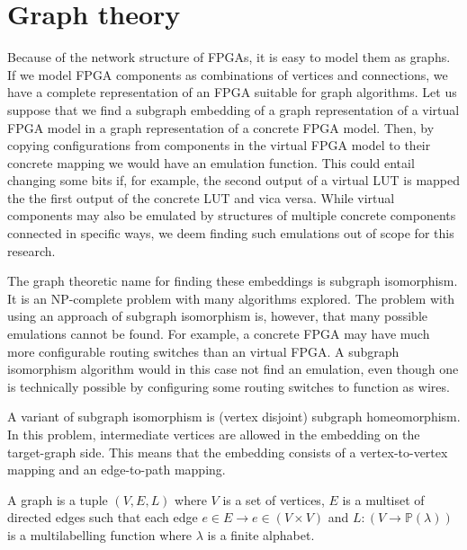\section{Graph theory}
Because of the network structure of FPGAs, it is easy to model them as graphs. If we model FPGA components as combinations of vertices and connections, we have a complete representation of an FPGA suitable for graph algorithms. Let us suppose that we find a subgraph embedding of a graph representation of a virtual FPGA model in a graph representation of a concrete FPGA model. Then, by copying configurations from components in the virtual FPGA model to their concrete mapping we would have an emulation function. This could entail changing some bits if, for example, the second output of a virtual LUT is mapped the the first output of the concrete LUT and vica versa. While virtual components may also be emulated by structures of multiple concrete components connected in specific ways, we deem finding such emulations out of scope for this research.

The graph theoretic name for finding these embeddings is subgraph isomorphism. It is an NP-complete problem\cite{cook} with many algorithms explored. The problem with using an approach of subgraph isomorphism is, however, that many possible emulations cannot be found. For example, a concrete FPGA may have much more configurable routing switches than an virtual FPGA. A subgraph isomorphism algorithm would in this case not find an emulation, even though one is technically possible by configuring some routing switches to function as wires.

A variant of subgraph isomorphism is (vertex disjoint) subgraph homeomorphism. In this problem, intermediate vertices are allowed in the embedding on the target-graph side. This means that the embedding consists of a vertex-to-vertex mapping and an edge-to-path mapping.


\begin{defn}[graph]
A graph is a tuple $(V, E, L)$ where $V$ is a set of vertices, $E$ is a multiset of directed edges such that each edge $e \in E \to e \in (V \times V)$ and $L: (V \to \mathbb{P}(\lambda))$ is a multilabelling function where $\lambda$ is a finite alphabet.
\label{def:graph}
\end{defn}


